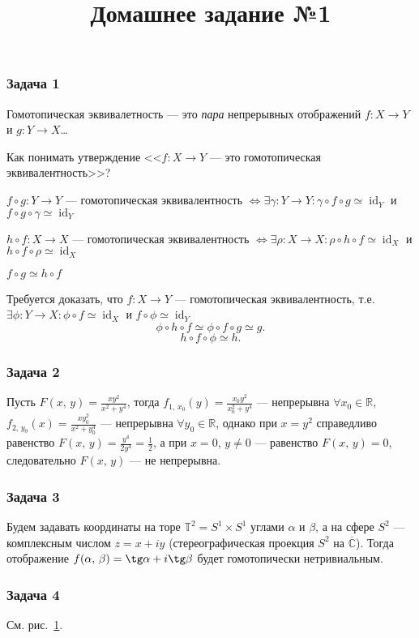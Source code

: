 \documentclass[a4paper]{article}
\title{Домашнее задание №1}
\newcommand{\prob}[1]{\subsubsection*{#1}}
\begin{document}
	\maketitle
	\prob{Задача 1}
	\begin{sol}
	Гомотопическая эквивалетность --- это \emph{пара} непрерывных
	отображений $f: X \to Y$ и $g: Y\to X$\ldots

	Как понимать утверждение <<$f: X\to Y$ --- это
	гомотопическая эквивалентность>>?

	$f \circ g : Y\to Y$ --- гомотопическая эквивалентность
	$\Leftrightarrow \exists \gamma: Y\to Y: \gamma \circ f
	\circ g \simeq \operatorname{id}_Y$ и $f \circ g\circ
	\gamma \simeq \operatorname{id}_Y$

	$h \circ f : X\to X$ --- гомотопическая эквивалентность
	$\Leftrightarrow \exists \rho: X\to X: \rho \circ h
	\circ f \simeq \operatorname{id}_X$ и $h \circ f\circ
	\rho \simeq \operatorname{id}_X$

	$f \circ g \simeq h \circ f$

	Требуется доказать, что $f: X\to Y$ --- гомотопическая
	эквивалентность, т.\:е. 
	$\exists \phi: Y\to X: \phi \circ f
	\simeq \operatorname{id}_X$ и $f \circ \phi
	\simeq \operatorname{id}_Y$
	\[
	\phi \circ h \circ f \simeq \phi \circ f \circ g \simeq g
	.\] 
	\[
	h \circ f \circ \phi \simeq h
	.\] 
	\end{sol}
	\prob{Задача 2}
	\begin{sol}
		Пусть $F(x,\,y)= \frac{x y^2}{x^2+y^4}$,
		тогда $f_{1,\,x_0}(y)= \frac{x_0 y^2}{x_0^2+y^4}$ 
		--- непрерывна $\forall x_0\in \mathbb{R} $,
		$f_{2,\,y_0}(x)= \frac{x y_0^2}{x^2+y_0^4}$ ---
		непрерывна $\forall y_0 \in \mathbb{R}$, однако при
		$x=y^2$ справедливо равенство $F(x,\,y)=\frac{y^4}{
		2y^4}=\frac{1}{2}$, а при $x=0$, $y \neq 0$ ---
		равенство  $F(x,\,y)=0$, следовательно
		$F(x,\,y)$ --- не непрерывна.
	\end{sol}
	\prob{Задача 3}
	\begin{sol}
		Будем задавать координаты на торе $\mathbb{T}^2=S^1
		\times S^1$ углами $\alpha$ и $\beta$, а на сфере $S^2$ --- комплексным числом
		$z = x + i y$ (стереографическая проекция $S^2$ на
		$\overline{\mathbb{C}}$).
		Тогда отображение
		$
			f(\alpha,\,\beta)=\tg \alpha+i\tg \beta
		$ будет гомотопически нетривиальным.
	\end{sol}
	\prob{Задача 4}
	\begin{sol} См. рис.~\ref{fig:2}.
\begin{figure}[ht]
    \centering
    \caption{}
    \label{fig:2}
\end{figure}
	\end{sol}
\end{document}

